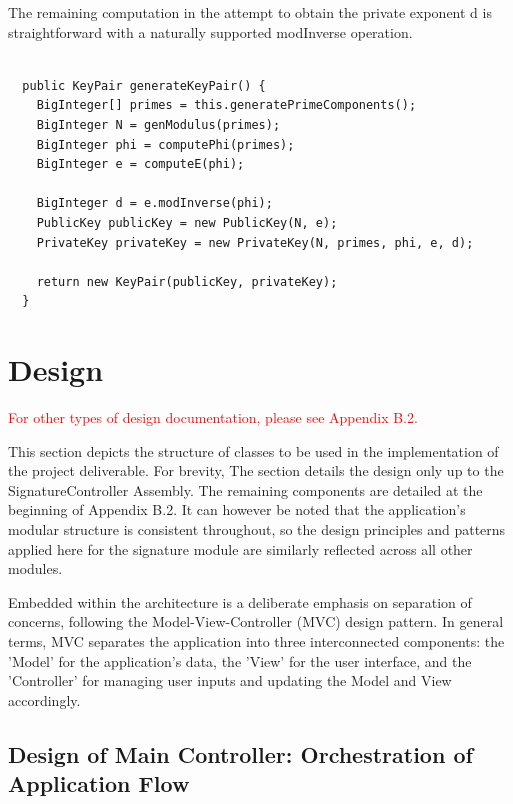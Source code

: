 \documentclass[]{final_report}
\theoremstyle{definition}
\begin{document}
The remaining computation in the attempt to obtain the private exponent d is straightforward with a naturally supported modInverse operation.
\begin{lstlisting}[caption=Java Implementation of Key Generation (\ref{subSec:keygen})]
  
  public KeyPair generateKeyPair() {
    BigInteger[] primes = this.generatePrimeComponents();
    BigInteger N = genModulus(primes);
    BigInteger phi = computePhi(primes);
    BigInteger e = computeE(phi);
    
    BigInteger d = e.modInverse(phi);
    PublicKey publicKey = new PublicKey(N, e);
    PrivateKey privateKey = new PrivateKey(N, primes, phi, e, d);

    return new KeyPair(publicKey, privateKey);
  }

\end{lstlisting}


\section{Design}

\textcolor{red} {For other types of design documentation, please see Appendix B.2.}

This section depicts the structure of classes to be used in the implementation of the project deliverable. For brevity, The section details the design only up to the SignatureController Assembly. The remaining components are detailed at the beginning of Appendix B.2. It can however be noted that the application's modular structure is consistent throughout, so the design principles and patterns applied here for the signature module are similarly reflected across all other modules. 

Embedded within the architecture is a deliberate emphasis on separation of concerns, following the Model-View-Controller (MVC) design pattern. In general terms, MVC separates the application into three interconnected components: the 'Model' for the application's data, the 'View' for the user interface, and the 'Controller' for managing user inputs and updating the Model and View accordingly.
\subsection{Design of Main Controller: Orchestration of Application Flow}
\end{document}
